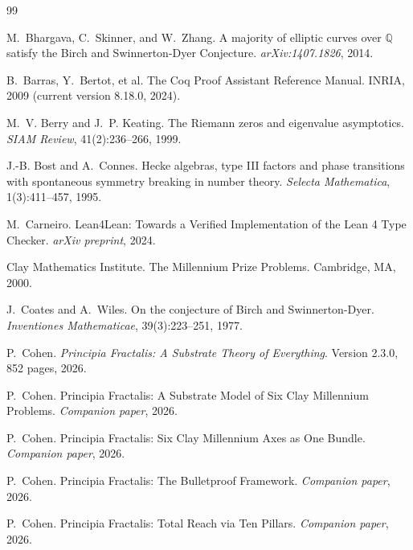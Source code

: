 \documentclass[11pt,a4paper]{amsart}
\theoremstyle{plain}
\theoremstyle{definition}
\begin{document}

\begin{thebibliography}{99}

M.~Bhargava, C.~Skinner, and W.~Zhang.
\newblock A majority of elliptic curves over $\mathbb{Q}$ satisfy the Birch and Swinnerton-Dyer Conjecture.
\newblock \emph{arXiv:1407.1826}, 2014.

B.~Barras, Y.~Bertot, et al.
\newblock The Coq Proof Assistant Reference Manual.
\newblock INRIA, 2009 (current version 8.18.0, 2024).

M.~V. Berry and J.~P. Keating.
\newblock The Riemann zeros and eigenvalue asymptotics.
\newblock \emph{SIAM Review}, 41(2):236--266, 1999.

J.-B. Bost and A.~Connes.
\newblock Hecke algebras, type III factors and phase transitions with spontaneous symmetry breaking in number theory.
\newblock \emph{Selecta Mathematica}, 1(3):411--457, 1995.

M.~Carneiro.
\newblock Lean4Lean: Towards a Verified Implementation of the Lean 4 Type Checker.
\newblock \emph{arXiv preprint}, 2024.

Clay Mathematics Institute.
\newblock The Millennium Prize Problems.
\newblock Cambridge, MA, 2000.

J.~Coates and A.~Wiles.
\newblock On the conjecture of Birch and Swinnerton-Dyer.
\newblock \emph{Inventiones Mathematicae}, 39(3):223--251, 1977.

P.~Cohen.
\newblock \emph{Principia Fractalis: A Substrate Theory of Everything}.
\newblock Version 2.3.0, 852 pages, 2026.

P.~Cohen.
\newblock Principia Fractalis: A Substrate Model of Six Clay Millennium Problems.
\newblock \emph{Companion paper}, 2026.

P.~Cohen.
\newblock Principia Fractalis: Six Clay Millennium Axes as One Bundle.
\newblock \emph{Companion paper}, 2026.

P.~Cohen.
\newblock Principia Fractalis: The Bulletproof Framework.
\newblock \emph{Companion paper}, 2026.

P.~Cohen.
\newblock Principia Fractalis: Total Reach via Ten Pillars.
\newblock \emph{Companion paper}, 2026.


\end{thebibliography}
\end{document}
